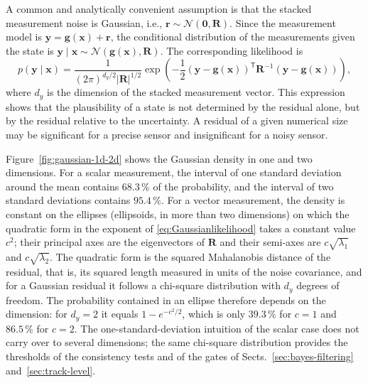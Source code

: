 \documentclass[graybox,envcountchap]{style/SNmono}
\begin{document}
A common and analytically convenient assumption is that the stacked measurement noise is Gaussian, i.e., $\mathbf{r} \sim \mathcal{N} \left( \mathbf{0}, \mathbf{R} \right)$. Since the measurement model is $\mathbf{y}=\mathbf{g}(\mathbf{x})+\mathbf{r}$, the conditional distribution of the measurements given the state is $\mathbf{y}\mid\mathbf{x} \sim \mathcal{N} \left( \mathbf{g}(\mathbf{x}), \mathbf{R} \right)$. 
The corresponding likelihood is
\begin{equation}
\label{eq:Gaussianlikelihood}
p(\mathbf{y}\mid\mathbf{x}) = \frac{1}{(2\pi)^{d_y/2}|\mathbf{R}|^{1/2}}\exp \left( - \frac{1}{2} \left( \mathbf{y}-\mathbf{g}(\mathbf{x})\right)^{\mathsf T}\mathbf{R}^{-1}\left(\mathbf{y}-\mathbf{g}(\mathbf{x})\right)\right),
\end{equation}
where $d_y$ is the dimension of the stacked measurement vector. This expression shows that the plausibility of a state is not determined by the residual alone, but by the residual relative to the uncertainty. A residual of a given numerical size may be significant for a precise sensor and insignificant for a noisy sensor.

Figure~\ref{fig:gaussian-1d-2d} shows the Gaussian density in one and two dimensions. For a scalar measurement, the interval of one standard deviation around the mean contains $68.3\,\%$ of the probability, and the interval of two standard deviations contains $95.4\,\%$. For a vector measurement, the density is constant on the ellipses (ellipsoids, in more than two dimensions) on which the quadratic form in the exponent of \eqref{eq:Gaussianlikelihood} takes a constant value $c^2$; their principal axes are the eigenvectors of $\mathbf{R}$ and their semi-axes are $c\sqrt{\lambda_1}$ and $c\sqrt{\lambda_2}$. The quadratic form is the squared Mahalanobis distance of the residual, that is, its squared length measured in units of the noise covariance, and for a Gaussian residual it follows a chi-square distribution with $d_y$ degrees of freedom. The probability contained in an ellipse therefore depends on the dimension: for $d_y=2$ it equals $1-e^{-c^2/2}$, which is only $39.3\,\%$ for $c=1$ and $86.5\,\%$ for $c=2$. The one-standard-deviation intuition of the scalar case does not carry over to several dimensions; the same chi-square distribution provides the thresholds of the consistency tests and of the gates of Sects.~\ref{sec:bayes-filtering} and~\ref{sec:track-level}.
\end{document}
